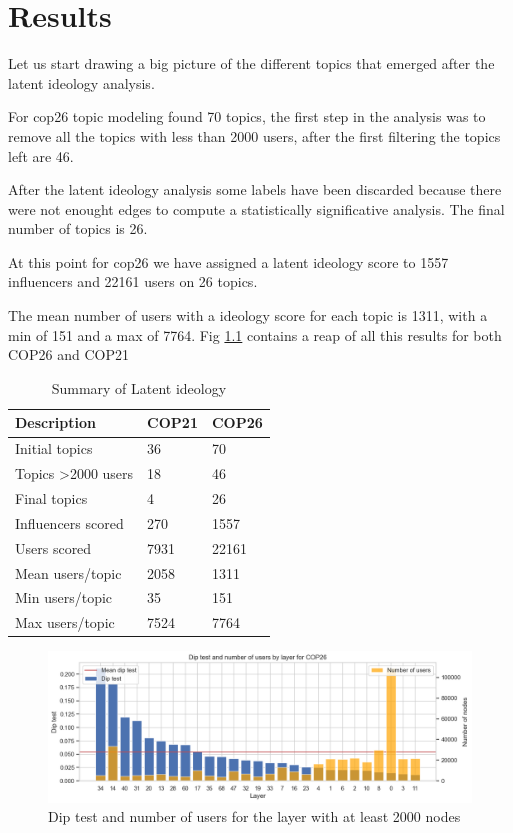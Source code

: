 \chapter{Results}%
Let us start drawing a big picture of the different topics that emerged after the latent ideology analysis. 

For cop26 topic modeling found 70 topics, the first step in the analysis was to remove all the topics with less than 2000 users, after the first filtering the topics left are 46. 

After the latent ideology analysis some labels have been discarded because there were not enought edges to compute a statistically significative analysis. The final number of topics is 26.

 At this point for cop26 we have assigned a latent ideology score to 1557 influencers and 22161 users on 26 topics. 

The mean number of users with a ideology score for each topic is 1311, with a min of 151 and a max of 7764. Fig \ref{tab:recap_ideology} contains a reap of all this results for both COP26 and COP21

\begin{table}[h]
    \centering
    \begin{tabular}{|l|l|l|}
        \hline
        \textbf{Description} & \textbf{COP21} & \textbf{COP26} \\ \hline
        Initial topics & 36 & 70 \\ \hline
        Topics >2000 users & 18 & 46 \\ \hline
        Final topics & 4 & 26 \\ \hline
        Influencers scored & 270 & 1557 \\ \hline
        Users scored & 7931 & 22161 \\ \hline
        Mean users/topic &  2058 & 1311 \\ \hline
        Min users/topic & 35 & 151 \\ \hline
        Max users/topic & 7524 & 7764 \\ \hline
        \end{tabular}
        \caption{Summary of Latent ideology}
    \label{tab:recap_ideology}
\end{table}


\begin{figure}
    \centering
    \includegraphics[width=0.95\linewidth]{Chapter5//figures/diptest_cop26.png}
    \caption{Dip test and number of users for the layer with at least 2000 nodes}
    \label{fig:diptest}
\end{figure}

